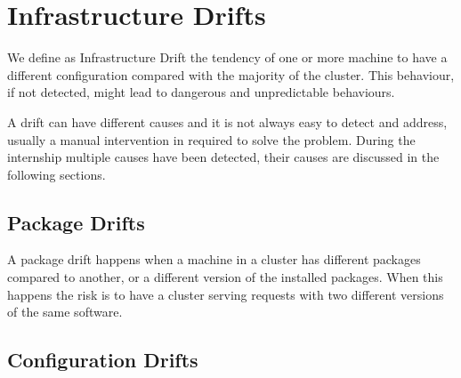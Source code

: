 \section{Infrastructure Drifts}

We define as Infrastructure Drift the tendency of one or more machine to
have a different configuration compared with the majority of the cluster.
This behaviour, if not detected, might lead to dangerous and unpredictable
behaviours.

A drift can have different causes and it is not always easy to detect and
address, usually a manual intervention in required to solve the problem.
During the internship multiple causes have been detected, their causes are
discussed in the following sections.

\subsection{Package Drifts}

A package drift happens when a machine in a cluster has different packages
compared to another, or a different version of the installed packages.
When this happens the risk is to have a cluster serving requests with two
different versions of the same software.

\subsection{Configuration Drifts}
